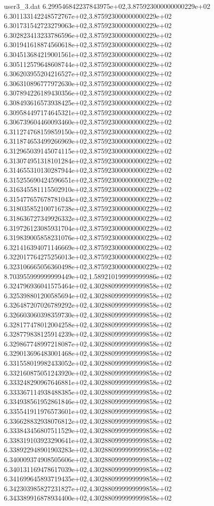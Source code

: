 \begin{filecontents}{user3_3.dat}
6.299546842237843975e+02,3.875923000000000229e+02
6.301133142248572767e+02,3.875923000000000229e+02
6.301731542723279063e+02,3.875923000000000229e+02
6.302823413233786596e+02,3.875923000000000229e+02
6.301941618874560618e+02,3.875923000000000229e+02
6.304513684219001561e+02,3.875923000000000229e+02
6.305112579648608744e+02,3.875923000000000229e+02
6.306203955204216527e+02,3.875923000000000229e+02
6.306310896777972630e+02,3.875923000000000229e+02
6.307894226189430356e+02,3.875923000000000229e+02
6.308493616573938425e+02,3.875923000000000229e+02
6.309584497174645321e+02,3.875923000000000229e+02
6.306739604460093460e+02,3.875923000000000229e+02
6.311274768159859150e+02,3.875923000000000229e+02
6.311874653499266969e+02,3.875923000000000229e+02
6.312965039145074115e+02,3.875923000000000229e+02
6.313074951318101284e+02,3.875923000000000229e+02
6.314655310130287944e+02,3.875923000000000229e+02
6.315255690424596651e+02,3.875923000000000229e+02
6.316345581115502910e+02,3.875923000000000229e+02
6.315477657678781043e+02,3.875923000000000229e+02
6.318035852100716738e+02,3.875923000000000229e+02
6.318636727349926332e+02,3.875923000000000229e+02
6.319726123085931704e+02,3.875923000000000229e+02
6.319839005858231076e+02,3.875923000000000229e+02
6.321416394071146669e+02,3.875923000000000229e+02
6.322017764275256013e+02,3.875923000000000229e+02
6.323106665056360498e+02,3.875923000000000229e+02
8.703955999999999449e+02,1.589210199999999986e+02
6.324796936041575464e+02,4.302880999999999858e+02
6.325398801200585694e+02,4.302880999999999858e+02
6.326487207026789292e+02,4.302880999999999858e+02
6.326603060398359730e+02,4.302880999999999858e+02
6.328177478012004258e+02,4.302880999999999858e+02
6.328779838125914239e+02,4.302880999999999858e+02
6.329867748997218087e+02,4.302880999999999858e+02
6.329013696483001468e+02,4.302880999999999858e+02
6.331558019982433052e+02,4.302880999999999858e+02
6.332160875051243920e+02,4.302880999999999858e+02
6.333248290967646881e+02,4.302880999999999858e+02
6.333367114938488385e+02,4.302880999999999858e+02
6.334938561952861846e+02,4.302880999999999858e+02
6.335541911976573601e+02,4.302880999999999858e+02
6.336628832938076812e+02,4.302880999999999858e+02
6.333843456807511529e+02,4.302880999999999858e+02
6.338319103923290641e+02,4.302880999999999858e+02
6.338922948901903283e+02,4.302880999999999858e+02
6.340009374908505606e+02,4.302880999999999858e+02
6.340131169478617039e+02,4.302880999999999858e+02
6.341699645893719435e+02,4.302880999999999858e+02
6.342303985827231827e+02,4.302880999999999858e+02
6.343389916878934400e+02,4.302880999999999858e+02

\end{filecontents}
